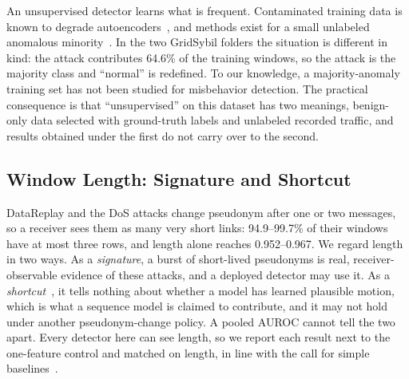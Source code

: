 An unsupervised detector learns what is frequent. Contaminated training data is known to degrade
autoencoders~\cite{zhou2017anomaly,ruff2021unifying}, and methods exist for a small unlabeled anomalous
minority~\cite{qiu2022latent}. In the two GridSybil folders the situation is different in kind: the attack
contributes 64.6\% of the training windows, so the attack is the majority class and ``normal'' is redefined.
 To our knowledge, a
majority-anomaly training set has not been studied for misbehavior detection. The practical consequence is that
``unsupervised'' on this dataset has two meanings, benign-only data selected with ground-truth labels and
unlabeled recorded traffic, and results obtained under the first do not carry over to the second.

\subsection{Window Length: Signature and Shortcut}\label{sec:disc-length}

DataReplay and the DoS attacks change pseudonym after one or two messages, so a receiver sees them as many
very short links: 94.9--99.7\% of their windows have at most three rows, and length alone reaches 0.952--0.967.
We regard length in two ways. As a \emph{signature}, a burst of short-lived pseudonyms is real, receiver-observable
evidence of these attacks, and a deployed detector may use it. As a \emph{shortcut}~\cite{geirhos2020shortcut},
it tells nothing about whether a model has learned plausible motion, which is what a sequence model is claimed to
contribute, and it may not hold under another pseudonym-change policy. A pooled AUROC cannot tell the two apart.
Every detector here can see length, so we report each result next to the one-feature control and matched on
length, in line with the call for simple baselines~\cite{arp2022dos,kim2022rigorous}.

